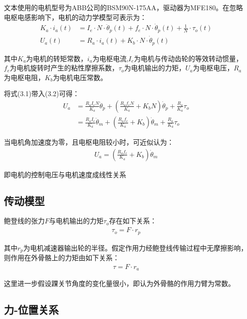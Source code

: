 文本使用的电机型号为ABB公司的BSM90N-175AA，驱动器为MFE180。在忽略电枢电感影响下，电机的动力学模型可表示为：
\begin{align}
K_{a} \cdot i_{a}(t)&=I_{e} \cdot N \cdot \ddot{\theta}_{p}(t)+f_{e} \cdot N \cdot \dot{\theta}_{p}(t)+\frac{1}{N} \cdot \tau_{o}(t) \\ 
U_{a}(t)&=R_{a} \cdot i_{a}(t)+K_{b} \cdot N \cdot \dot{\theta}_{p}(t)
\end{align}

其中$K_a$为电机的转矩常数，$i_a$为电枢电流,$I_e$为电机与传动齿轮的等效转动惯量，$f_e$为电机旋转时产生的粘性摩擦系数，$\tau_o$为电机输出的力矩，$U_a$为电枢电压，$R_a$为电枢电阻，$K_b$为电机电压常数。

将式(3.1)带入(3.2)可得：
\begin{align} U_{a} &=\frac{R_{a} I_{e} N}{K_{a}} \ddot{\theta}_{p}+\left(\frac{R_{a} f_{e} N}{K_{a}}+K_{b} N\right) \dot{\theta}_{p}+\frac{R_{a}}{K_{a}} \tau_{o} \\ &=\frac{R_{a} I_{e}}{K_{a}} \ddot{\theta}_{m}+\left(\frac{R_{a} f_{e}}{K_{a}}+K_{b}\right) \dot{\theta}_{m}+\frac{R_{a}}{K_{a}} \tau_{o} 
\end{align}

当电机角加速度为零，且电枢电阻较小时，可近似认为：
\begin{align}
U_{a}=\left(\frac{R_{a} f_{e}}{K_{a}}+K_{b}\right) \dot{\theta}_{m}
\end{align}

即电机的控制电压与电机速度成线性关系

\subsection{传动模型}

鲍登线的张力$F$与电机输出的力矩$\tau_o$存在如下关系：
\begin{align}
    \tau_o = F\cdot r_p
\end{align}

其中$r_p$为电机减速器输出轮的半径。假定作用力经鲍登线传输过程中无摩擦影响，则作用在外骨骼上的力矩由如下关系：
\begin{align}
    \tau = F\cdot r_a
\end{align}

这里进一步假设踝关节角度的变化量很小，即认为外骨骼的作用力臂为常数。

\subsection{力-位置关系}


